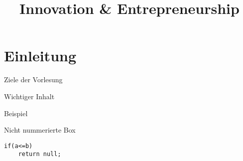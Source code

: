 \documentclass{cheatsheet}
\title{Innovation \& Entrepreneurship}
\begin{document}
    \section{Einleitung}
    \begin{sectionbox}{Ziele der Vorlesung}
        \begin{warningbox}{Wichtiger Inhalt}
        \end{warningbox}
        \begin{hintbox}{Beispiel}
        \end{hintbox}
    \end{sectionbox}
    \begin{normbox}{Nicht nummerierte Box}
        \begin{verbatim}
if(a<=b)
    return null;
        \end{verbatim}
    \end{normbox}
\end{document}
